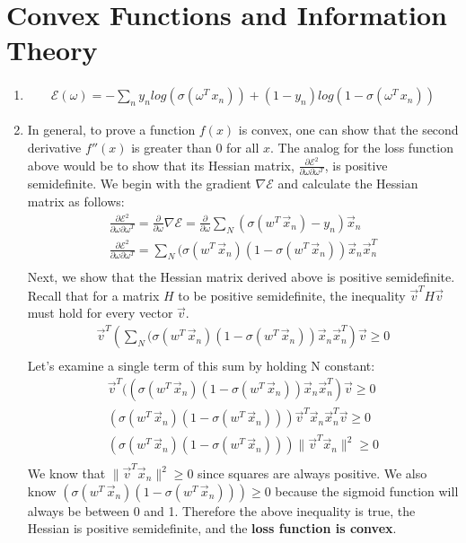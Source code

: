 \documentclass[12pt]{article}
\begin{document}
\section{Convex Functions and Information Theory}
\begin{enumerate}[label=\alph*.]
    \item 
	\begin{gather*}
		\mathcal{E} (\omega) =  - \sum_n{y_n log(\sigma(\omega^T \, x_n)) + (1 - y_n)log(1 - \sigma(\omega^T \, x_n))}
	\end{gather*}
    \item
	In general, to prove a function $f(x)$ is convex, one can show that the second derivative $f''(x)$ is greater than 0 for all $x$. The analog for the loss function above would be to show that its Hessian matrix, $ \frac{ \partial \mathcal{E}^2 }{ \partial \omega \partial \omega^T }  $, is positive semidefinite. We begin with the gradient $ \nabla \mathcal{E} $ and calculate the Hessian matrix as follows:
	\begin{gather*}
		\frac{ \partial \mathcal{E}^2 }{ \partial \omega \partial \omega^T } =  \frac{\partial}{\partial \omega} \nabla \mathcal{E} = \frac{\partial}{\partial \omega} \sum_N{(\sigma(w^T \, \vec{x}_n) - y_n)\vec{x}_n} \\
		\frac{ \partial \mathcal{E}^2 }{ \partial \omega \partial \omega^T } =  \sum_N{(\sigma(w^T \, \vec{x}_n)(1 - \sigma(w^T \, \vec{x}_n))\vec{x}_n}\vec{x}_n^T \\
	\end{gather*}
	Next, we show that the Hessian matrix derived above is positive semidefinite. Recall that for a matrix $H$ to be positive semidefinite, the inequality $ \vec{v}^TH\vec{v} $ must hold for every vector $\vec{v}$.
	\begin{gather*}
		\vec{v}^T (\sum_N{(\sigma(w^T \, \vec{x}_n)(1 - \sigma(w^T \, \vec{x}_n))\vec{x}_n}\vec{x}_n^T) \vec{v} \geq 0 \\
	\end{gather*}
	Let's examine a single term of this sum by holding N constant:
	\begin{gather*}
		\vec{v}^T ((\sigma(w^T \, \vec{x}_n)(1 - \sigma(w^T \, \vec{x}_n)) \vec{x}_n \vec{x}_n^T) \vec{v} \geq 0 \\
		(\sigma(w^T \, \vec{x}_n)(1 - \sigma(w^T \, \vec{x}_n))) \vec{v}^T  \vec{x}_n \vec{x}_n^T \vec{v} \geq 0 \\
		(\sigma(w^T \, \vec{x}_n)(1 - \sigma(w^T \, \vec{x}_n))) \lVert \vec{v}^T \vec{x}_n \rVert^2 \geq 0 \\
	\end{gather*}
	We know that $ \lVert \vec{v}^T \vec{x}_n \rVert^2 \geq 0 $ since squares are always positive. We also know $ (\sigma(w^T \, \vec{x}_n)(1 - \sigma(w^T \, \vec{x}_n))) \geq 0 $ because the sigmoid function will always be between 0 and 1. Therefore the above inequality is true, the Hessian is positive semidefinite, and the \textbf{loss function is convex}.


\end{enumerate}
\end{document}
